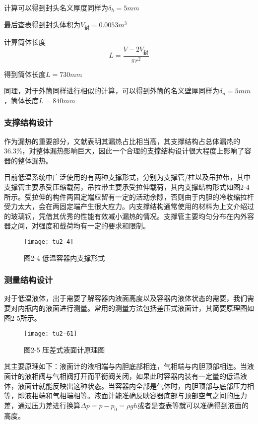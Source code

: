 \documentclass[UTF8,a4paper]{ctexart}
\newcommand{\upcite}[1]{\textsuperscript{\textsuperscript{\cite{#1}}}}
\begin{document}
	计算可以得到封头名义厚度同样为$\delta_{h}=5mm$
	
	最后查表得到封头体积为$V_{\text{封}}=0.0053m^{3}$
	
	计算筒体长度
	\begin{equation*}
	L=\dfrac{V-2V_{\text{封}}}{\pi r^{2}}
	\end{equation*}
	
	得到筒体长度$L=730mm$
	
	同理，对于外筒同样进行相似的计算，可以得到外筒的名义壁厚同样为$\delta_{n}=5mm$，筒体长度$L=840mm$
	\subsubsection{支撑结构设计}
	作为漏热的重要部分，文献表明其漏热占比相当高\upcite{ref12}，其支撑结构占总体漏热的36.3\%，对整体漏热影响巨大，因此一个合理的支撑结构设计很大程度上影响了容器的整体漏热。
	
	目前低温系统中广泛使用的有两种支撑形式，分别为支撑管/柱以及吊拉带，其中支撑管主要承受压缩载荷，吊拉带主要承受拉伸载荷，其内支撑结构形式如图2-4所示\upcite{ref13}。受拉伸的构件两固定端应留有一定的活动余隙，否则由于内胆的冷收缩拉杆受力太大，会在两固定端产生很大应力。内支撑结构通常使用的材料为上文介绍过的玻璃钢，凭借其优秀的性能有效减小漏热的情况。支撑管主要均匀分布在内外容器之间，对强度和载荷均有一定的要求和限制。
	\begin{figure}[H]
		\centering
		\texttt{[image: tu2-4]}
		\caption*{图2-4 低温容器内支撑形式}
		\label{fig:tu2-4}
	\end{figure}
	
	
	\subsubsection{测量结构设计}
	对于低温液体，出于需要了解容器内液面高度以及容器内液体状态的需要，我们需要对内瓶内的液面进行测量。常用的测量方法包括差压式液面计，其简要原理图如图2-5所示。
	\begin{figure}[H]
		\centering
		\texttt{[image: tu2-61]}
		\caption*{图2-5 压差式液面计原理图}
		\label{fig:tu2-5}
	\end{figure}
	
	其主要原理如下：液面计的液相端与内胆底部相连，气相端与内胆顶部相连。当液面计的液相阀与气相阀打开而平衡阀关闭，如果此时容器内装有一定量的低温液体，液面计就能反映出这种状态。当容器内全部是气体时，内胆顶部与底部压力相等，即液相端和气相端相等。液面计能准确反映容器底部与顶部空气之间的压力差，通过压力差进行换算$\Delta p=p-p_{0}=\rho gh$或者是查表等就可以准确得到液面的高度\upcite{ref9}。
	
\end{document}
